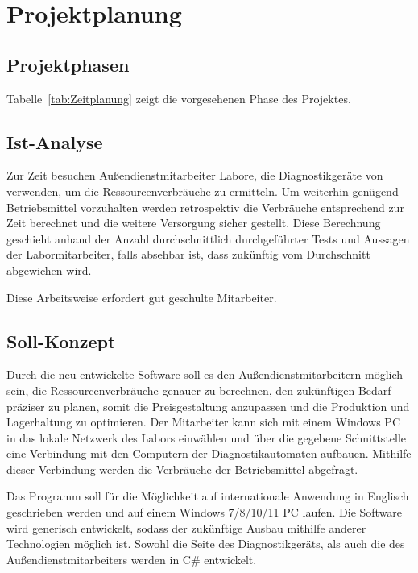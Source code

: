 \section{Projektplanung}
\label{sec:Projektplanung}

\subsection{Projektphasen} 
\label{sec:Projektphasen}

Tabelle~\ref{tab:Zeitplanung} zeigt die vorgesehenen Phase des Projektes.
\\ 

\subsection{Ist-Analyse} 
\label{sec:IstAnalyse}
Zur Zeit besuchen Außendienstmitarbeiter Labore, die Diagnostikgeräte von {\betriebNameKzf} verwenden, um die Ressourcenverbräuche zu ermitteln. Um weiterhin genügend Betriebsmittel vorzuhalten werden retrospektiv die Verbräuche entsprechend zur Zeit berechnet und die weitere Versorgung sicher gestellt. Diese Berechnung geschieht anhand der Anzahl durchschnittlich durchgeführter Tests und Aussagen der Labormitarbeiter, falls absehbar ist, dass zukünftig vom Durchschnitt abgewichen wird.

Diese Arbeitsweise erfordert gut geschulte Mitarbeiter.

\subsection{Soll-Konzept}
\label{sec:SollKonzept}
Durch die neu entwickelte Software soll es den Außendienstmitarbeitern möglich sein, die Ressourcenverbräuche genauer zu berechnen, den zukünftigen Bedarf präziser zu planen, somit die Preisgestaltung anzupassen und die Produktion und Lagerhaltung zu optimieren. Der Mitarbeiter kann sich mit einem Windows PC in das lokale Netzwerk des Labors einwählen und über die gegebene Schnittstelle eine Verbindung mit den Computern der Diagnostikautomaten aufbauen. Mithilfe dieser Verbindung werden die Verbräuche der Betriebsmittel abgefragt.

Das Programm soll für die Möglichkeit auf internationale Anwendung in Englisch geschrieben werden und auf einem Windows 7/8/10/11 PC laufen. Die Software wird generisch entwickelt, sodass der zukünftige Ausbau mithilfe anderer Technologien möglich ist. Sowohl die Seite des Diagnostikgeräts, als auch die des Außendienstmitarbeiters werden in C\# entwickelt.


